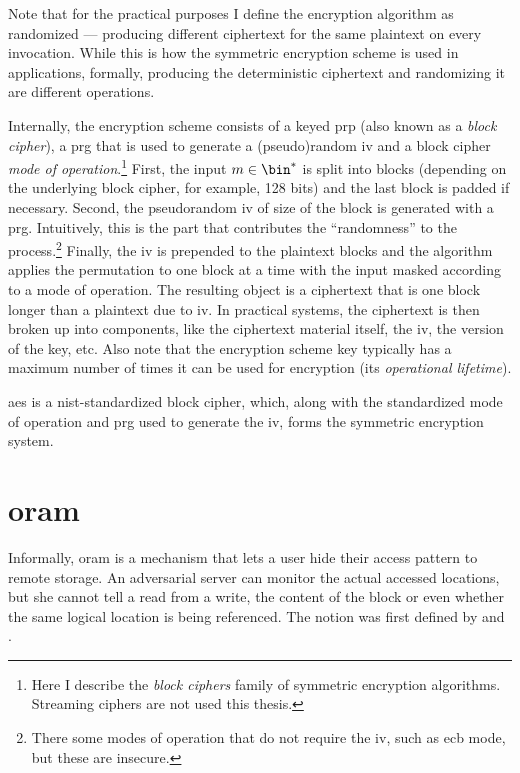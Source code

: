 			Note that for the practical purposes I define the encryption algorithm as randomized --- producing different ciphertext for the same plaintext on every invocation.
			While this is how the symmetric encryption scheme is used in applications, formally, producing the deterministic ciphertext and randomizing it are different operations.

			Internally, the encryption scheme consists of a keyed \acrfull{prp} (also known as a \emph{block cipher}), a \acrfull{prg} that is used to generate a (pseudo)random \acrfull{iv} and a block cipher \emph{mode of operation}.\footnote{%
				Here I describe the \emph{block ciphers} family of symmetric encryption algorithms.
				Streaming ciphers are not used this thesis.
			}
			First, the input $m \in \bin^*$ is split into blocks (depending on the underlying block cipher, for example, 128 bits) and the last block is padded if necessary.
			Second, the pseudorandom \acrlong{iv} of size of the block is generated with a \acrshort{prg}.
			Intuitively, this is the part that contributes the  ``randomness'' to the process.\footnote{
				There some modes of operation that do not require the \acrlong{iv}, such as \acrfull{ecb} mode, but these are insecure.
			}
			Finally, the \acrshort{iv} is prepended to the plaintext blocks and the algorithm applies the permutation to one block at a time with the input masked according to a mode of operation.
			The resulting object is a ciphertext that is one block longer than a plaintext due to \acrshort{iv}.
			In practical systems, the ciphertext is then broken up into components, like the ciphertext material itself, the \acrshort{iv}, the version of the key, etc.
			Also note that the encryption scheme key typically has a maximum number of times it can be used for encryption (its \emph{operational lifetime}).

			\acrfull{aes} \cite{aes-nist} is a \acrshort{nist}-standardized block cipher, which, along with the standardized mode of operation \cite{nist-modes} and \acrshort{prg} \cite{nist-prg} used to generate the \acrshort{iv}, forms the symmetric encryption system.

	\section{\texorpdfstring{\acrlong{oram}}{Oblivious Random Access Machine}}\label{section:background:oram}

		Informally, \acrfull{oram} is a mechanism that lets a user hide their access pattern to remote storage.
		An adversarial server can monitor the actual accessed locations, but she cannot tell a read from a write, the content of the block or even whether the same logical location is being referenced.
		The notion was first defined by \textcite{oram-theory} and \textcite{oram-original}.

